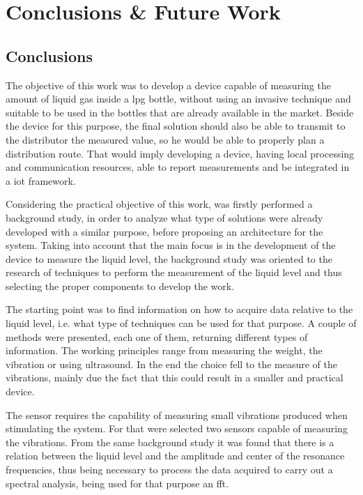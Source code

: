 \cleardoublepage
\chapter{Conclusions \& Future Work}\label{chap:finalremarks}

\section{Conclusions}
The objective of this work was to develop a device capable of measuring the amount of liquid gas inside a \acrshort{lpg} bottle, without using an invasive technique and suitable to be used in the bottles that  are already available in the market. Beside the device for this purpose, the final solution should also be able to transmit to the distributor the measured value, so he would be able to properly plan a distribution route. That would imply developing a device, having local processing and communication resources, able to report measurements and be integrated in a \acrshort{iot} framework.

Considering the practical objective of this work, was firstly performed a background study, in order to analyze what type of solutions were already developed with a similar purpose, before proposing an architecture for the system. Taking into account that the main focus is in the development of the device to measure the liquid level, the background study was oriented to the research of techniques to perform the measurement of the liquid level and thus selecting the proper components to develop the work.

The starting point was to find information on how to acquire data relative to the liquid level, i.e. what type of techniques can be used for that purpose. A couple of methods were presented, each one of them, returning different types of information. The working principles range from measuring the weight, the vibration or using ultrasound. In the end the choice fell to the measure of the vibrations, mainly due the fact that this could result in a smaller and practical device. 

The sensor requires the capability of measuring small vibrations produced when stimulating the system. For that were selected two sensors capable of measuring the vibrations. From the same background study it was found that there is a relation between the liquid level and the amplitude and center of the resonance frequencies, thus being necessary to process the data acquired to carry out a spectral analysis, being used for that purpose an \acrshort{fft}.

